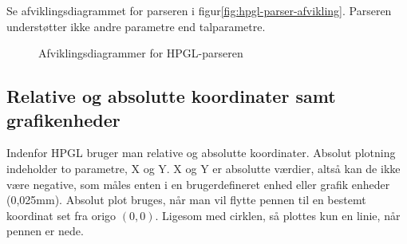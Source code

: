 Se afviklingsdiagrammet for parseren i
figur\vref{fig:hpgl-parser-afvikling}. Parseren understøtter ikke
andre parametre end talparametre.

\begin{figure}[htbp]
  \centering
  \qquad
  \caption{Afviklingsdiagrammer for HPGL-parseren}
  \label{fig:hpgl-parser-afvikling}
\end{figure}


\subsection{Relative og absolutte koordinater samt grafikenheder}
\label{sc:relativ-absolut}

Indenfor HPGL bruger man relative og absolutte koordinater. Absolut
plotning indeholder to parametre, X og Y. X og Y er absolutte værdier,
altså kan de ikke være negative, som måles enten i en brugerdefineret
enhed eller grafik enheder (0,025mm). Absolut plot bruges, når man vil
flytte pennen til en bestemt koordinat set fra origo $(0, 0)$. Ligesom
med cirklen, så plottes kun en linie, når pennen er nede.



